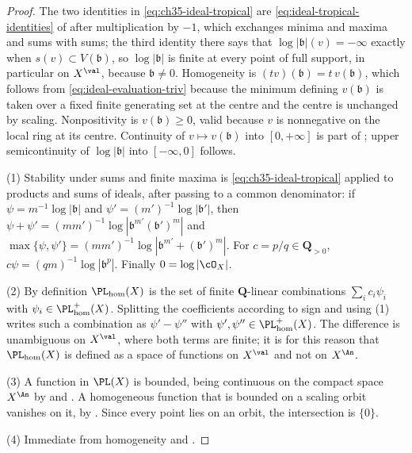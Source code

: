 \begin{proof}
The two identities in \eqref{eq:ch35-ideal-tropical} are
\eqref{eq:ideal-tropical-identities} of
 after multiplication by $-1$, which
exchanges minima and maxima and sums with sums; the third identity there
says that $\log|\mathfrak b|(v)=-\infty$ exactly when
$s(v)\subset V(\mathfrak b)$, so $\log|\mathfrak b|$ is finite at every
point of full support, in particular on $X^{\val}$, because
$\mathfrak b\neq0$.  Homogeneity is
$(tv)(\mathfrak b)=t\,v(\mathfrak b)$, which follows from
\eqref{eq:ideal-evaluation-triv} because the minimum defining
$v(\mathfrak b)$ is taken over a fixed finite generating set at the centre
and the centre is unchanged by scaling.  Nonpositivity is
$v(\mathfrak b)\geq0$, valid because $v$ is nonnegative on the local
ring at its centre.  Continuity of $v\mapsto v(\mathfrak b)$ into
$[0,+\infty]$ is part of ; upper
semicontinuity of $\log|\mathfrak b|$ into
$[-\infty,0]$ follows.

(1)  Stability under sums and finite maxima is
\eqref{eq:ch35-ideal-tropical} applied to products and sums of ideals, after
passing to a common denominator: if
$\psi=m^{-1}\log|\mathfrak b|$ and
$\psi'=(m')^{-1}\log|\mathfrak b'|$, then
$\psi+\psi'=(mm')^{-1}\log|\mathfrak b^{m'}(\mathfrak b')^{m}|$ and
$\max\{\psi,\psi'\}=(mm')^{-1}\log|\mathfrak b^{m'}+(\mathfrak b')^{m}|$.
For $c=p/q\in\mathbf Q_{>0}$, $c\psi=(qm)^{-1}\log|\mathfrak b^{p}|$.
Finally $0=\log|\cO_X|$.

(2)  By definition $\PL_{\mathrm{hom}}(X)$ is the set of finite
$\mathbf Q$-linear combinations $\sum_ic_i\psi_i$ with
$\psi_i\in\PL_{\mathrm{hom}}^+(X)$.  Splitting the coefficients according
to sign and using (1) writes such a combination as
$\psi'-\psi''$ with $\psi',\psi''\in\PL_{\mathrm{hom}}^+(X)$.  The
difference is unambiguous on $X^{\val}$, where both terms are finite; it
is for this reason that $\PL_{\mathrm{hom}}(X)$ is defined as a space of
functions on $X^{\val}$ and not on $X^{\An}$.

(3)  A function in $\PL(X)$ is bounded, being continuous on the compact
space $X^{\An}$ by  and
.  A homogeneous function that is
bounded on a scaling orbit vanishes on it, by
.  Since every point lies on an
orbit, the intersection is $\{0\}$.

(4)  Immediate from homogeneity and
.
\end{proof}

